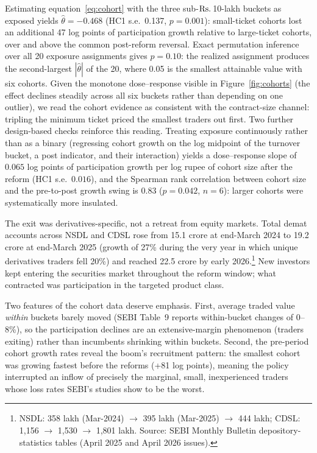 \documentclass[12pt]{article}
\newcommand{\rupee}{\text{Rs.}\,}
\begin{document}
Estimating equation~\eqref{eq:cohort} with the three sub-\(\text{\rupee}\)10-lakh
buckets as exposed yields $\hat{\theta} = -0.468$ (HC1 s.e.\ 0.137,
$p=0.001$): small-ticket cohorts lost an additional 47 log points of
participation growth relative to large-ticket cohorts, over and above the
common post-reform reversal. Exact permutation inference over all 20
exposure assignments gives $p = 0.10$: the realized assignment produces the
second-largest $|\hat{\theta}|$ of the 20, where 0.05 is the smallest
attainable value with six cohorts. Given the monotone dose--response
visible in Figure~\ref{fig:cohorts} (the effect declines steadily across all
six buckets rather than depending on one outlier), we read the cohort
evidence as consistent with the contract-size channel: tripling the
minimum ticket priced the smallest traders out first. Two further
design-based checks reinforce this reading. Treating exposure continuously
rather than as a binary (regressing cohort growth on the log midpoint of
the turnover bucket, a post indicator, and their interaction) yields a
dose--response slope of $0.065$ log points of participation growth per log
rupee of cohort size after the reform (HC1 s.e.\ $0.016$), and the Spearman
rank correlation between cohort size and the pre-to-post growth swing is
$0.83$ ($p=0.042$, $n=6$): larger cohorts were systematically more
insulated.

The exit was derivatives-specific, not a retreat from equity markets.
Total demat accounts across NSDL and CDSL rose from 15.1 crore at
end-March 2024 to 19.2 crore at end-March 2025 (growth of 27\% during the
very year in which unique derivatives traders fell 20\%) and reached
22.5 crore by early 2026.\footnote{NSDL: 358 lakh (Mar-2024)
$\rightarrow$ 395 lakh (Mar-2025) $\rightarrow$ 444 lakh; CDSL: 1,156
$\rightarrow$ 1,530 $\rightarrow$ 1,801 lakh. Source: SEBI Monthly
Bulletin depository-statistics tables (April 2025 and April 2026 issues).}
New investors kept entering the securities market throughout the reform
window; what contracted was participation in the targeted product class.

Two features of the cohort data deserve emphasis. First, average traded
value \emph{within} buckets barely moved (SEBI Table~9 reports within-bucket
changes of 0--8\%), so the participation declines are an extensive-margin
phenomenon (traders exiting) rather than incumbents shrinking within
buckets. Second, the pre-period cohort growth rates reveal the boom's
recruitment pattern: the smallest cohort was growing fastest before the
reforms (+81 log points), meaning the policy interrupted an inflow of
precisely the marginal, small, inexperienced traders whose loss rates SEBI's
studies show to be the worst.
\end{document}
